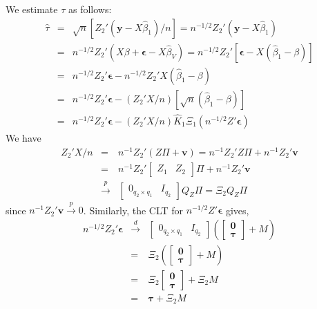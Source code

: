 \documentclass[12pt]{article}
\theoremstyle{definition}
\begin{document}
We estimate $\tau$ as follows:
\begin{eqnarray*}
  \widehat{\tau} &=& \sqrt{n} \left[ Z_2' \left(\textbf{y} - X\widehat{\beta}_1\right)/n\right] = n^{-1/2} Z_2'\left(\textbf{y} - X\widehat{\beta}_1\right)\\
      &=& n^{-1/2} Z_2'(X\beta + \boldsymbol{\epsilon} - X \widehat{\beta}_V) = n^{-1/2} Z_2' \left[\boldsymbol{\epsilon} - X(\widehat{\beta}_1 - \beta)\right]\\
      &=& n^{-1/2} Z_2'\boldsymbol{\epsilon} - n^{-1/2} Z_2' X (\widehat{\beta}_1 - \beta)\\
      &=& n^{-1/2} Z_2'\boldsymbol{\epsilon} - (Z_2' X/n) \left[  \sqrt{n}(\widehat{\beta}_1 - \beta)\right]\\
      &=&n^{-1/2} Z_2'\boldsymbol{\epsilon} - (Z_2' X/n)\widehat{K}_1 \Xi_1 (n^{-1/2}Z'\boldsymbol{\epsilon})
\end{eqnarray*}
We have
  \begin{eqnarray*}
    Z_2'X/n &=& n^{-1} Z_2'(Z\Pi + \mathbf{v}) = n^{-1}Z_2'Z\Pi + n^{-1}Z_2'\mathbf{v}\\  
            &=& n^{-1}Z_2' \left[\begin{array}
              {cc} Z_1 & Z_2 
            \end{array} \right] \Pi + n^{-1}Z_2'\mathbf{v}\\
            &\overset{p}{\rightarrow}&  \left[ \begin{array}{cc}
              0_{q_2 \times q_1}& I_{q_2}
            \end{array}\right] Q_Z \Pi = \Xi_2 Q_Z \Pi
  \end{eqnarray*}
since $n^{-1}Z_2'\mathbf{v} \overset{p}{\rightarrow} 0$. Similarly, the CLT for $n^{-1/2}Z'\boldsymbol{\epsilon}$ gives,
\begin{eqnarray*}
  n^{-1/2} Z_2' \boldsymbol{\epsilon} &\overset{d}{\rightarrow}& \left[ \begin{array}{cc} 0_{q_2 \times q_1}& I_{q_2}
            \end{array}\right]   \left(\left[\begin{array}
           {c} \mathbf{0} \\ \boldsymbol{\tau}
         \end{array}\right] + M \right)\\
         &=& \Xi_2  \left(\left[\begin{array}
           {c} \mathbf{0} \\ \boldsymbol{\tau}
         \end{array}\right] + M \right)\\
         &=& \Xi_2\left[\begin{array}
           {c} \mathbf{0} \\ \boldsymbol{\tau}
         \end{array}\right] + \Xi_2 M \\
         &=& \boldsymbol{\tau} + \Xi_2 M
\end{eqnarray*}
\end{document}
